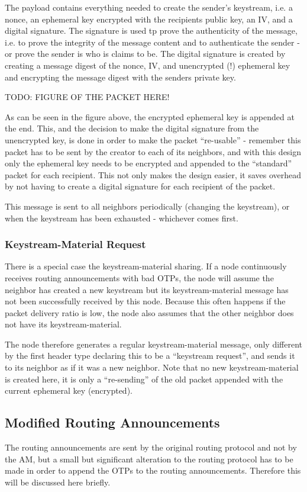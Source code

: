 The payload contains everything needed to create the sender's keystream, i.e. a
nonce, an ephemeral key encrypted with the recipients public key, an IV, and a
digital signature. The signature is used tp prove the authenticity of the
message, i.e. to prove the integrity of the message content and to authenticate
the sender - or prove the sender is who is claims to be. The digital signature
is created by creating a message digest of the nonce, IV, and unencrypted (!)
ephemeral key and encrypting the message digest with the senders private key.

TODO: FIGURE OF THE PACKET HERE!

As can be seen in the figure above, the encrypted ephemeral key is appended at
the end. This, and the decision to make the digital signature from the
unencrypted key, is done in order to make the packet ``re-usable'' - remember
this packet has to be sent by the creator to each of its neighbors, and with
this design only the ephemeral key needs to be encrypted and appended to the
``standard'' packet for each recipient. This not only makes the design easier,
it saves overhead by not having to create a digital signature for each recipient
of the packet.

This message is sent to all neighbors periodically (changing the keystream), or
when the keystream has been exhausted - whichever comes first.

\subsubsection*{Keystream-Material Request}
There is a special case the keystream-material sharing. If a node continuously
receives routing announcements with bad \acp{OTP}, the node will assume the
neighbor has created a new keystream but its keystream-material message has not
been successfully received by this node. Because this often happens if the
packet delivery ratio is low, the node also assumes that the other neighbor does
not have its keystream-material.

The node therefore generates a regular keystream-material message, only
different by the first header type declaring this to be a ``keystream request'',
and sends it to its neighbor as if it was a new neighbor. Note that no new
keystream-material is created here, it is only a ``re-sending'' of the old
packet appended with the current ephemeral key (encrypted).

\subsection{Modified Routing Announcements}
The routing announcements are sent by the original routing protocol and not by
the \ac{AM}, but a small but significant alteration to the routing protocol has
to be made in order to append the \acp{OTP} to the routing announcements.
Therefore this will be discussed here briefly.

